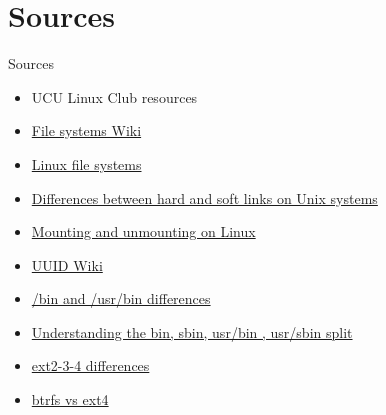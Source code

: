 \documentclass[usenames,dvipsnames,10pt,aspectratio=169]{beamer}
\begin{document}
\section{Sources}
\begin{frame}{Sources}
    \begin{itemize}
        \item UCU Linux Club resources
        \item \href{https://en.wikipedia.org/wiki/File_system}{File systems Wiki}
        \item \href{https://www.javatpoint.com/linux-files}{Linux file systems}
        \item \href{http://www.differencebetween.net/technology/difference-between-soft-link-and-hard-link-in-unix-in-os/}{Differences between hard and soft links on Unix systems}
        \item \href{https://techviewleo.com/mounting-and-unmounting-filesystems-on-linux/}{Mounting and unmounting on Linux}
        \item \href{https://en.wikipedia.org/wiki/Universally_unique_identifier}{UUID Wiki}
        \item \href{https://unix.stackexchange.com/questions/5915/difference-between-bin-and-usr-bin}{/bin and /usr/bin differences}
        \item \href{http://lists.busybox.net/pipermail/busybox/2010-December/074114.html}{Understanding the bin, sbin, usr/bin , usr/sbin split}
        \item \href{https://www.thegeekstuff.com/2011/05/ext2-ext3-ext4/}{ext2-3-4 differences}
        \item \href{https://linuxhint.com/btrfs-vs-ext4-filesystems-comparison/}{btrfs vs ext4}
    \end{itemize}
\end{frame}
\end{document}

